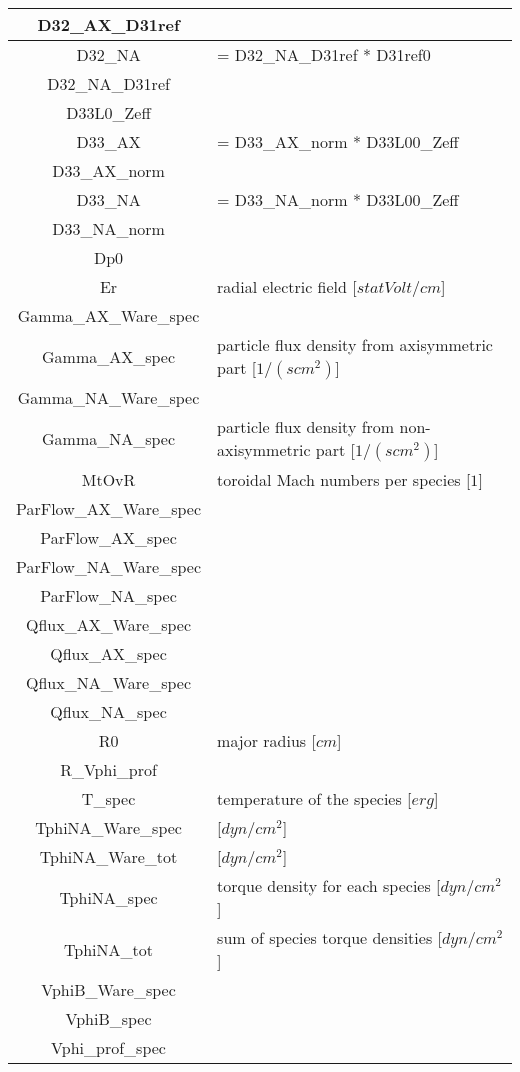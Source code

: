 \begin{table}[h]
\begin{tabular}{|c|l|}
\hline
D32\_AX\_D31ref & \\
\hline
D32\_NA & = D32\_NA\_D31ref * D31ref0 \\
\hline
D32\_NA\_D31ref & \\
\hline
D33L0\_Zeff & \\
\hline
D33\_AX & = D33\_AX\_norm * D33L00\_Zeff \\
\hline
D33\_AX\_norm & \\
\hline
D33\_NA & = D33\_NA\_norm * D33L00\_Zeff \\
\hline
D33\_NA\_norm & \\
\hline
Dp0 & \\
\hline
Er & radial electric field [$statVolt/cm$] \\
\hline
Gamma\_AX\_Ware\_spec & \\
\hline
Gamma\_AX\_spec & particle flux density from axisymmetric part [$1/(s cm^2)$] \\
\hline
Gamma\_NA\_Ware\_spec & \\
\hline
Gamma\_NA\_spec & particle flux density from non-axisymmetric part [$1/(s cm^2)$] \\
\hline
MtOvR & toroidal Mach numbers per species [$1$] \\
\hline
ParFlow\_AX\_Ware\_spec & \\
\hline
ParFlow\_AX\_spec & \\
\hline
ParFlow\_NA\_Ware\_spec & \\
\hline
ParFlow\_NA\_spec & \\
\hline
Qflux\_AX\_Ware\_spec & \\
\hline
Qflux\_AX\_spec & \\
\hline
Qflux\_NA\_Ware\_spec & \\
\hline
Qflux\_NA\_spec & \\
\hline
R0 & major radius [$cm$] \\
\hline
R\_Vphi\_prof & \\
\hline
T\_spec & temperature of the species [$erg$] \\
\hline
TphiNA\_Ware\_spec & [$dyn/cm^2$] \\
\hline
TphiNA\_Ware\_tot & [$dyn/cm^2$] \\
\hline
TphiNA\_spec & torque density for each species [$dyn/cm^2$] \\
\hline
TphiNA\_tot & sum of species torque densities [$dyn/cm^2$] \\
\hline
VphiB\_Ware\_spec & \\
\hline
VphiB\_spec & \\
\hline
Vphi\_prof\_spec & \\

\end{tabular}
\end{table}
